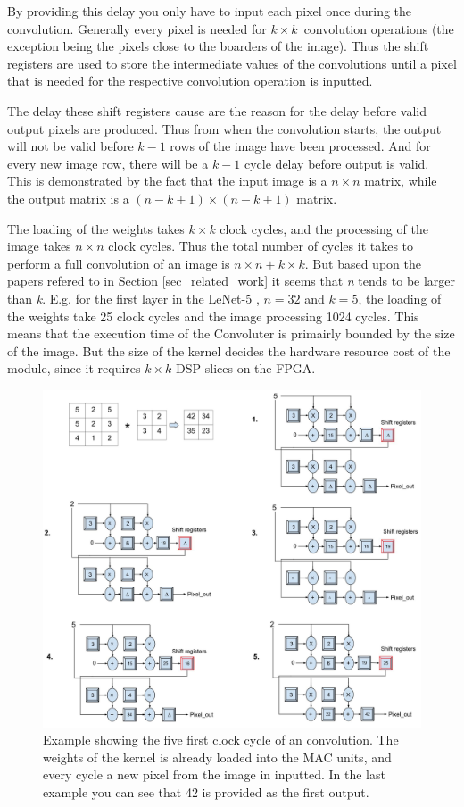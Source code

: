 By providing this delay you only have to input each pixel once during the convolution. Generally every pixel is needed for $ k \times k $ convolution operations (the exception being the pixels close to the boarders of the image). Thus the shift registers are used to store the intermediate values of the convolutions until a pixel that is needed for the respective convolution operation is inputted. 

The delay these shift registers cause are the reason for the delay before valid output pixels are produced. Thus from when the convolution starts, the output will not be valid before $ k-1 $ rows of the image have been processed. And for every new image row, there will be a $ k-1 $ cycle delay before output is valid. This is demonstrated by the fact that the input image is a $ n \times n $ matrix, while the output matrix is a $ (n-k+1) \times (n-k+1) $ matrix. 

The loading of the weights takes $ k \times k $ clock cycles, and the processing of the image takes $ n \times n $ clock cycles. Thus the total number of cycles it takes to perform a full convolution of an image is $ n \times n + k \times k $. But based upon the papers refered to in Section \ref{sec_related_work} it seems that \textit{n} tends to be larger than \textit{k}. E.g. for the first layer in the LeNet-5 \cite{LeCun1998}, $ n = 32 $ and $ k = 5 $, the loading  of the weights take 25 clock cycles and the image processing 1024 cycles. This means that the execution time of the Convoluter is primairly bounded by the size of the image. But the size of the kernel decides the hardware resource cost of the module, since it requires $ k \times k $ DSP slices on the FPGA.

\begin{figure}[h!]
  \centering
      \includegraphics[width=1.1\textwidth]{Figures/Method/Conv_example}
  \caption{Example showing the five first clock cycle of an convolution. The weights of the kernel is already loaded into the MAC units, and every cycle a new pixel from the image in inputted. In the last example you can see that 42 is provided as the first output.}
\end{figure}

